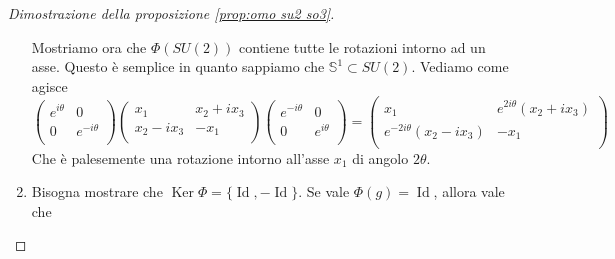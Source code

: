 \documentclass[11pt]{article}
\theoremstyle{plain}
\theoremstyle{definition}
\theoremstyle{remark}
\DeclareMathOperator{\Ker}{Ker}
\DeclareMathOperator{\Id}{Id}
\begin{document}
\begin{proof}[Dimostrazione della proposizione \ref{prop:omo su2 so3}]
\begin{enumerate}
{     Mostriamo ora che $\Phi(SU(2))$ contiene tutte le rotazioni intorno ad un asse. Questo è semplice in quanto sappiamo che $\mathbb{S}^1 \subset SU(2)$. Vediamo come agisce
     \[
     \left(
     \begin{array}{cc}
       e^{i\theta} & 0 \\
       0 & e^{-i\theta} \\
     \end{array}
     \right)
     \left(
     \begin{array}{cc}
       x_1 & x_2 + i x_3 \\
       x_2 - ix_3 & -x_1 \\
     \end{array}
     \right)
     \left(
     \begin{array}{cc}
       e^{-i\theta} & 0 \\
       0 & e^{i\theta} \\
     \end{array}
     \right)
     =
     \left(
     \begin{array}{cc}
       x_1 & e^{2i\theta}(x_2 + i x_3) \\
       e^{-2i\theta}(x_2 - ix_3) & -x_1 \\
     \end{array}
     \right)
     \]
     Che è palesemente una rotazione intorno all'asse $x_1$ di angolo $2\theta$.
   }
   \item{
     Bisogna mostrare che $\Ker \Phi = \{\Id, -\Id\}$. Se vale $\Phi(g) = \Id$, allora vale che

}
\end{enumerate}
\end{proof}
\end{document}
